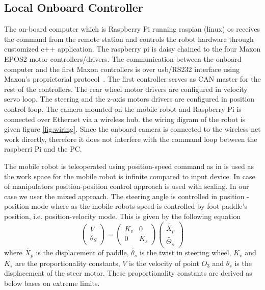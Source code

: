 \subsection{Local Onboard Controller}
The  on-board computer which is Raspberry Pi running raspian (linux) os receives the command from the remote station and controls the robot hardware through customized c++ application.
The raspberry pi  is daisy chained to the four Maxon EPOS2 motor controllers/drivers. The communication between the onboard computer and the first Maxon controllers is over usb/RS232 interface using Maxon's proprietorial protocol~\cite{maxonrs232}. The first controller serves as CAN master for the rest of the controllers. The rear wheel motor drivers are configured in velocity servo loop. The steering and the z-axis motors drivers are configured in position control loop.  The camera mounted on the mobile robot  and Raspberry Pi  is connected over Ethernet via a wireless hub. the wiring digram of the robot is given figure \ref {fig:wiring}. Since the onboard camera is connected to the wireless net work directly, therefore it does not interfere with the command loop between the raspberri Pi and the PC. 

The mobile robot is teleoperated using position-speed command as in \cite{farkhatdinov2007hybrid} is used as the work space for the mobile robot is infinite compared to input device. In case of manipulators position-position control approach is used with scaling. In our case we user the mixed approach. The steering angle is controlled in position -position mode where as the mobile robots speed is controlled by foot paddle's position, i.e. position-velocity mode. This is given by the following equation 
\begin{equation}
	\begin{pmatrix}
	V\\\theta_S
	\end{pmatrix}=
	\begin{pmatrix}
	K_v & 0\\0 & K_s
	\end{pmatrix}
	\begin{pmatrix}
	\tilde{X_p}\\
	\tilde{\Theta_s}
	\end{pmatrix}
\end{equation}
where $\tilde{X_p}$ is the displacement of  paddle, $\tilde{\theta_s}$ is the twist in steering wheel, $K_v$ and $K_s$ are the proportionality constants, $V$ is the velocity of point $O_3$ and $\theta_s$ is the displacement of the steer motor. These proportionality constants are derived as below bases on extreme limits. 

